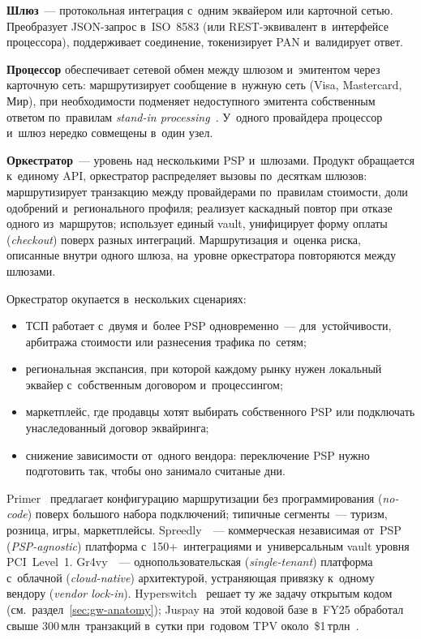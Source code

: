 \textbf{Шлюз}~--- протокольная интеграция
с~одним эквайером или карточной сетью. Преобразует JSON-запрос в~ISO~8583 (или
REST-эквивалент в~интерфейсе процессора), поддерживает соединение,
токенизирует PAN и~валидирует ответ.

\textbf{Процессор} обеспечивает сетевой обмен между шлюзом и~эмитентом через
карточную сеть: маршрутизирует сообщение в~нужную сеть (Visa, Mastercard, Мир),
при необходимости подменяет недоступного эмитента собственным ответом
по~правилам \textit{stand-in
processing}~\cite{mc-switching-services,nspk-mir-rules}. У~одного провайдера
процессор и~шлюз нередко совмещены в~один узел.

\textbf{Оркестратор}~--- уровень над несколькими PSP и~шлюзами. Продукт
обращается к~единому API, оркестратор распределяет вызовы по~десяткам шлюзов:
маршрутизирует транзакцию между провайдерами по~правилам стоимости, доли
одобрений и~регионального профиля; реализует каскадный повтор при отказе одного
из~маршрутов; использует единый vault,
унифицирует форму оплаты (\textit{checkout}) поверх разных интеграций.
Маршрутизация и~оценка риска, описанные внутри одного шлюза, на~уровне
оркестратора повторяются между шлюзами.

Оркестратор окупается в~нескольких сценариях:

\begin{itemize}
  \item ТСП работает с~двумя и~более PSP одновременно~--- для~устойчивости,
    арбитража стоимости или разнесения трафика по~сетям;
  \item региональная экспансия, при которой каждому рынку нужен локальный
    эквайер с~собственным договором и~процессингом;
  \item маркетплейс, где продавцы хотят выбирать собственного PSP или
    подключать унаследованный договор эквайринга;
  \item снижение зависимости от~одного вендора: переключение PSP нужно
    подготовить так, чтобы оно занимало считаные дни.
\end{itemize}

Primer~\cite{primer-orchestration} предлагает конфигурацию маршрутизации без
программирования (\textit{no-code}) поверх большого набора подключений;
типичные сегменты~--- туризм, розница, игры, маркетплейсы.
Spreedly~\cite{spreedly-orchestration}~--- коммерческая независимая от~PSP
(\textit{PSP-agnostic}) платформа с~150+~интеграциями и~универсальным vault
уровня PCI~Level~1. Gr4vy~\cite{gr4vy-orchestration}~--- однопользовательская
(\textit{single-tenant}) платформа с~облачной (\textit{cloud-native})
архитектурой, устраняющая привязку к~одному вендору (\textit{vendor lock-in}).
Hyperswitch~\cite{hyperswitch-juspay} решает ту же задачу открытым кодом
(см.~раздел~\ref{sec:gw-anatomy}); Juspay на~этой кодовой базе
в~FY25 обработал свыше 300\,млн~транзакций в~сутки при~годовом TPV
около~\$1\,трлн~\cite{juspay-fy25}.

